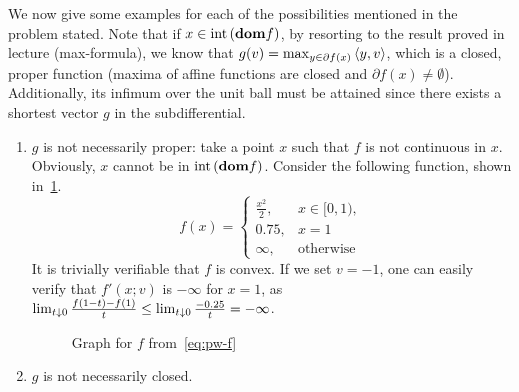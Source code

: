 \documentclass[10pt]{article}
\begin{document}
\begin{Exercise}
    We now give some examples for each of the possibilities mentioned in the
    problem stated. Note that if $x \in \mathrm{int}\left( \textbf{dom} f \right)$, by resorting to the
    result proved in lecture (max-formula), we know that $g(v) =
    \max_{y \in \partial f(x)} \left\langle y, v \right\rangle$, which is a closed, proper function
    (maxima of affine functions are closed and $\partial f(x)
    \neq \emptyset$). Additionally, its infimum over the unit ball must be
    attained since there exists a shortest vector $g$ in the subdifferential.
    \begin{enumerate}
    \item $g$ is not necessarily proper: take a point $x$ such that $f$ is not
    continuous in $x$. Obviously, $x$ cannot be in $\mathrm{int}\left( \textbf{dom} f \right)$. Consider
    the following function, shown in~\cref{fig:pw-f}.
    \begin{equation}
        f(x) = \begin{cases}
            \frac{x^2}{2}, & x \in [0, 1), \\
            0.75, & x = 1 \\
            \infty, & \text{otherwise}
        \end{cases}
        \label{eq:pw-f}
    \end{equation}
    It is trivially verifiable that $f$ is convex. If we set $v = -1$, one can
    easily verify that $f'(x; v)$ is $-\infty$ for $x = 1$, as $\lim_{t \downarrow 0}
    \frac{f(1 - t) - f(1)}{t} \leq \lim_{t \downarrow 0} \frac{-0.25}{t} = -\infty$.
    \begin{figure}[h]
        \centering
        \caption{Graph for $f$ from~\cref{eq:pw-f}}
        \label{fig:pw-f}
    \end{figure}
    \item $g$ is not necessarily closed.
    \end{enumerate}
\end{Exercise}
\end{document}
